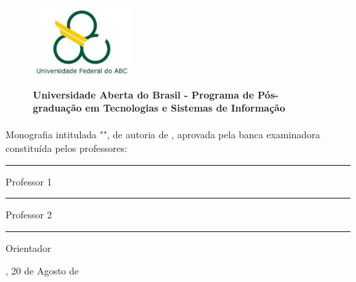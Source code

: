 \thispagestyle{empty}

\begin{figure}[!h]
    \begin{minipage}[c]{3.4cm}
        \includegraphics[height=2.7cm, keepaspectratio=true]{figuras/logo-ufabc}
    \end{minipage}
    \hfill
    \begin{minipage}[c]{20cm}
        \bfseries{
        Universidade Aberta do Brasil - {\imprimirinstituicao}
        \newline
        Programa de Pós-graduação em Tecnologias e Sistemas de Informação
    }
    \end{minipage}
\end{figure}

\paragraph*{}
    Monografia intitulada "\emph{\imprimirtitulo}", de autoria de
    {\imprimirautor}, aprovada pela banca examinadora constituída pelos
    professores:

\vspace{3cm}

\begin{center}
    \rule{12cm}{2pt}

    Professor 1

    \vspace{2cm}
    \rule{12cm}{2pt}

    Professor 2

    \vspace{2cm}
    \rule{12cm}{2pt}

    Orientador

    {\imprimirorientador}
\end{center}

\vfill

\begin{center}
    {\imprimirlocal}, 20 de Agosto de {\imprimirdata}
\end{center}
\newpage
